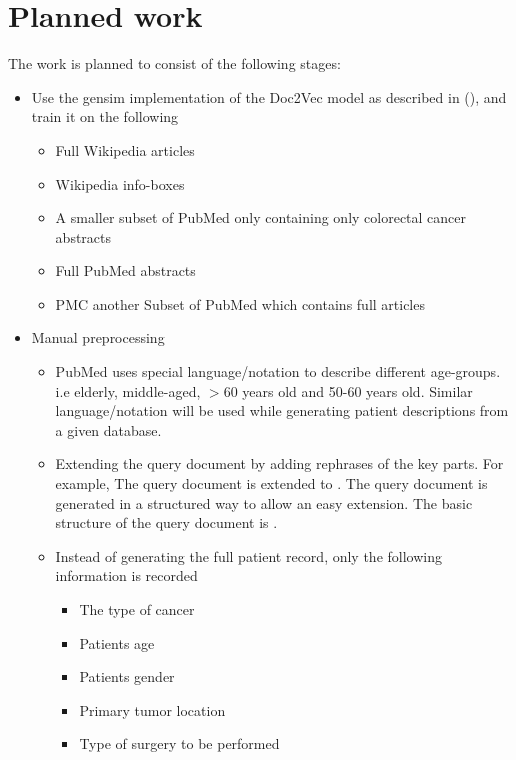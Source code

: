 \documentclass[12pt,a4paper] {article}
\begin{document}
		
	
	\section*{Planned work} 
	The work is planned to consist of the following stages:
	\begin{itemize}
		\item Use the gensim \cite{rehurek_lrec} implementation of the Doc2Vec model as described in (\cite{le2014distributed}), and train it on
		the following
		\begin{itemize}
			\item Full Wikipedia articles 
			\item Wikipedia info-boxes
			\item A smaller subset of PubMed only containing only  colorectal cancer abstracts
			\item Full PubMed abstracts
			\item PMC another Subset of PubMed which contains full articles
		\end{itemize}
		
		
		\item Manual preprocessing
		\begin{itemize}
			\item PubMed uses special language/notation to describe different age-groups. i.e elderly, middle-aged, $>$60 years old and 50-60 years old. Similar language/notation will be used while generating patient descriptions from a given database.
			
			\item Extending the query document by adding rephrases of the key parts. For example, The query document  is extended to . The query document is generated in a structured way to allow an easy extension. The basic structure of the query document is .
			 
			\item Instead of generating the full patient record, only the following information is recorded
			\begin{itemize}
				\item The type of cancer
				\item Patients age
				\item Patients gender
				\item Primary tumor location
				\item Type of surgery to be performed
				

\end{itemize}
\end{itemize}
\end{itemize}
\end{document}
